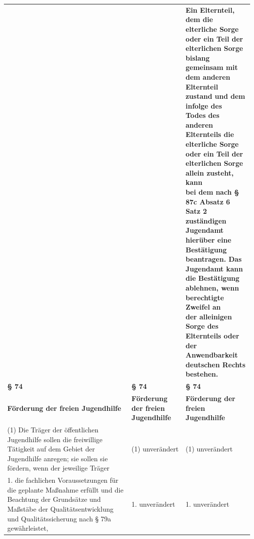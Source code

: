 \documentclass[10pt,a4paper,landscape]{article}
\begin{document}
\begin{longtable}{|L{8.2cm}|L{8.2cm}|L{8.2cm}|}
 &  & \textbf{\textcolor{diffgreen}{Ein Elternteil, dem die elterliche Sorge  \newline oder ein Teil der elterlichen Sorge  \newline bislang gemeinsam mit dem anderen  \newline Elternteil zustand und dem infolge des  \newline Todes des anderen Elternteils die  \newline elterliche Sorge oder ein Teil der  \newline elterlichen Sorge allein zusteht, kann  \newline bei dem nach \S{} 87c Absatz 6 Satz 2  \newline zuständigen Jugendamt hierüber eine  \newline Bestätigung beantragen. Das  \newline Jugendamt kann die Bestätigung  \newline ablehnen, wenn berechtigte Zweifel an  \newline der alleinigen Sorge des Elternteils oder  \newline der Anwendbarkeit deutschen Rechts  \newline bestehen.}} \\
\hhline{|---|}
\textbf{\S{} 74} & \textbf{\S{} 74} & \textbf{\S{} 74} \\
\hhline{|---|}
\textbf{Förderung der freien Jugendhilfe} & \textbf{Förderung der freien Jugendhilfe} & \textbf{Förderung der freien Jugendhilfe} \\
\hhline{|---|}
(1) Die Träger der öffentlichen Jugendhilfe  \newline sollen die freiwillige Tätigkeit auf dem  \newline Gebiet der Jugendhilfe anregen; sie sollen  \newline sie fördern, wenn der jeweilige Träger & (1) unverändert & (1) unverändert \\
\hhline{|---|}
1.  \newline die fachlichen Voraussetzungen für die  \newline geplante Maßnahme erfüllt und die  \newline Beachtung der Grundsätze und Maßstäbe  \newline der Qualitätsentwicklung und  \newline Qualitätssicherung nach \S{} 79a  \newline gewährleistet, & 1. unverändert & 1. unverändert \\

\end{longtable}
\end{document}
